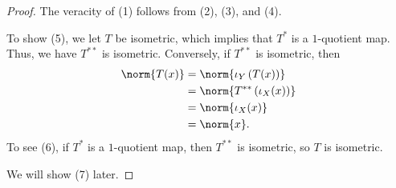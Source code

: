 \documentclass[10pt]{mypackage}
\begin{document}
\begin{proof}
  The veracity of (1) follows from (2), (3), and (4).\newline

  To show (5), we let $T$ be isometric, which implies that $T^{\ast}$ is a $1$-quotient map. Thus, we have $T^{\ast\ast}$ is isometric. Conversely, if $T^{\ast\ast}$ is isometric, then
  \begin{align*}
    \norm{T(x)} &= \norm{\iota_Y\left(T(x)\right)}\\
                &= \norm{T^{\ast\ast}\left(\iota_X(x)\right)}\\
                &= \norm{\iota_X(x)}\\
                &= \norm{x}.
  \end{align*}
  To see (6), if $T^{\ast}$ is a $1$-quotient map, then $T^{\ast\ast}$ is isometric, so $T$ is isometric.\newline

  We will show (7) later.
\end{proof}
\end{document}
